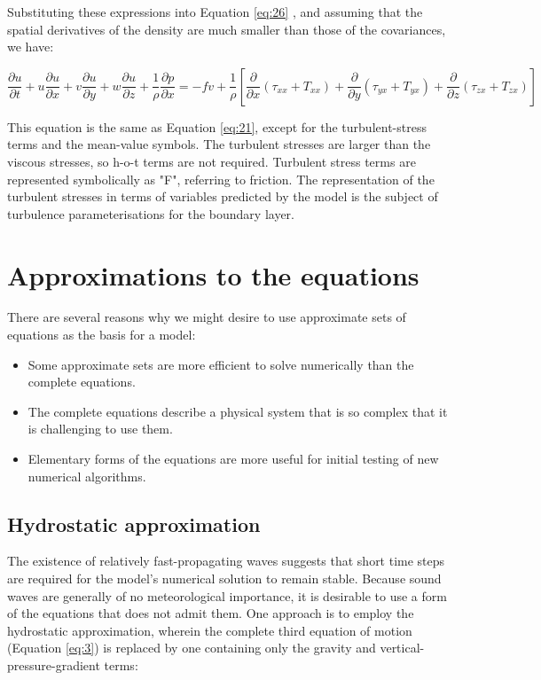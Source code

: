 \documentclass{article}
\begin{document}
Substituting these expressions into Equation \ref{eq:26} , and assuming that the spatial derivatives of the density are much smaller than those of the covariances, we have:

\begin{equation}
\frac{\partial u}{\partial t} + u\frac{\partial u}{\partial x} + v\frac{\partial u}{\partial y} + w\frac{\partial u}{\partial z} + \frac{1}{\rho}\frac{\partial p}{\partial x} = -fv + \frac{1}{\rho}\left[\frac{\partial}{\partial x}(\tau_{xx} + T_{xx}) + \frac{\partial}{\partial y}(\tau_{yx} + T_{yx}) + \frac{\partial}{\partial z}(\tau_{zx} + T_{zx})\right]
\label{eq:30}
\end{equation}

This equation is the same as Equation \ref{eq:21}, except for the turbulent-stress terms and the mean-value symbols. The turbulent stresses are larger than the viscous stresses, so h-o-t terms are not required. Turbulent stress terms are represented symbolically as "F", referring to friction. The representation of the turbulent stresses in terms of variables predicted by the model is the subject of turbulence parameterisations for the boundary layer.


\section{Approximations to the equations}
There are several reasons why we might desire to use approximate sets of equations as the basis for a model:

\begin{itemize}
    \item Some approximate sets are more efficient to solve numerically than the complete equations.
    \item The complete equations describe a physical system that is so complex that it is challenging to use them.
    \item Elementary forms of the equations are more useful for initial testing of new numerical algorithms. 
\end{itemize}

\subsection{Hydrostatic approximation}
The existence of relatively fast-propagating waves suggests that short time steps are required for the model's numerical solution to remain stable. Because sound waves are generally of no meteorological importance, it is desirable to use a form of the equations that does not admit them. One approach is to employ the hydrostatic approximation, wherein the complete third equation of motion (Equation \ref{eq:3}) is replaced by one containing only the gravity and vertical-pressure-gradient terms:
\end{document}
